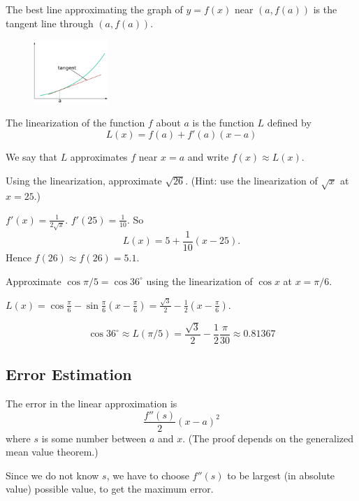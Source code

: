 \documentclass[calc1-main.tex]{subfiles}
\begin{document}
The best line approximating the graph of $y=f(x)$ near $(a, f(a))$ is the tangent line through $(a, f(a))$.

\begin{figure}[H]
  \centering
  \includegraphics[width=0.25\textwidth]{figures/4-7-lin-approx.png}
\end{figure}

The linearization of the function $f$ about $a$ is the function $L$ defined by
\[
  L(x) = f(a) + f'(a)(x-a)
\]

We say that $L$ approximates $f$ near $x=a$ and write $f(x) \approx L(x)$.

\begin{example}
  Using the linearization, approximate $\sqrt{26}$. (Hint: use the linearization of $\sqrt{x}$ at $x=25$.)
\end{example}
\begin{solution}
  $f'(x) = \frac{1}{2\sqrt{x}}$. $f'(25) = \frac{1}{10}$. So
  \[
    L(x) = 5 + \frac{1}{10} (x-25).
  \]
  Hence $f(26) \approx f(26) = 5.1$.
\end{solution}

\begin{example}
  Approximate $\cos \pi/5 = \cos 36^{\circ}$ using the linearization of $\cos x$ at $x=\pi/6$.
\end{example}

\begin{solution}
  $L(x) = \cos\frac{\pi}{6} - \sin \frac{\pi}{6}(x-\frac{\pi}{6}) = \frac{\sqrt{3}}{2} - \frac{1}{2}(x-\frac{\pi}{6})$.

  \[
    \cos 36^{\circ} \approx L(\pi/5) = \frac{\sqrt{3}}{2} - \frac{1}{2} \frac{\pi}{30} \approx 0.81367
  \]
\end{solution}

\subsection*{Error Estimation}
The error in the linear approximation is
\[
  \frac{f''(s)}{2}(x-a)^2
\]
where $s$ is some number between $a$ and $x$. (The proof depends on the generalized mean value theorem.)

Since we do not know $s$, we have to choose $f''(s)$ to be largest (in absolute value) possible value, to get the maximum error.
\end{document}
